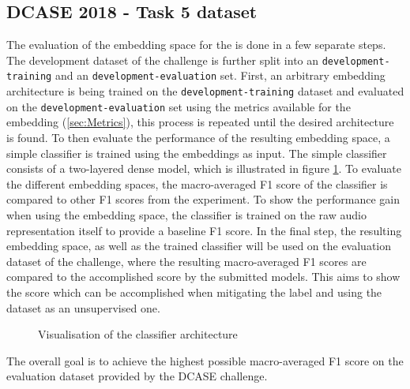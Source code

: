 \subsection{DCASE 2018 - Task 5 dataset}
\label{sub:Eval-DCASE}
The evaluation of the embedding space for the  is done in a few separate steps. The development dataset of the challenge is further split into an \texttt{development-training} and an \texttt{development-evaluation} set. First, an arbitrary embedding architecture is being trained on the \texttt{development-training} dataset and evaluated on the \texttt{development-evaluation} set using the metrics available for the embedding (\ref{sec:Metrics}), this process is repeated until the desired architecture is found.
\newline
\newline
To then evaluate the performance of the resulting embedding space, a simple classifier is trained using the embeddings as input. The simple classifier consists of a two-layered dense model, which is illustrated in figure \ref{fig:Classifier-DCASE-Visualisation}. To evaluate the different embedding spaces, the macro-averaged F1 score of the classifier is compared to other F1 scores from the experiment. To show the performance gain when using the embedding space, the classifier is trained on the raw audio representation itself to provide a baseline F1 score.
\newline
\newline
In the final step, the resulting embedding space, as well as the trained classifier will be used on the evaluation dataset of the challenge, where the resulting macro-averaged F1 scores are compared to the accomplished score by the submitted models. This aims to show the score which can be accomplished when mitigating the label and using the dataset as an unsupervised one.

\begin{figure}[htbp]
    \captionsetup{format=plain}
    \centering
    \caption{Visualisation of the classifier architecture}
    \label{fig:Classifier-DCASE-Visualisation}
\end{figure}
\noindent
The overall goal is to achieve the highest possible macro-averaged F1 score on the evaluation dataset provided by the DCASE challenge.

